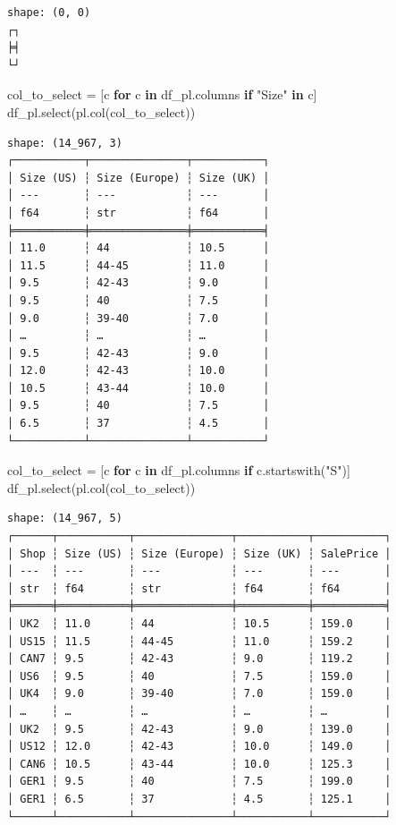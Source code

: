 \documentclass[
  letterpaper,
  DIV=11,
  numbers=noendperiod]{scrreprt}
\newenvironment{Shaded}{\begin{snugshade}}{\end{snugshade}}
\newcommand{\ControlFlowTok}[1]{\textcolor[rgb]{0.00,0.23,0.31}{\textbf{#1}}}
\newcommand{\KeywordTok}[1]{\textcolor[rgb]{0.00,0.23,0.31}{\textbf{#1}}}
\newcommand{\NormalTok}[1]{\textcolor[rgb]{0.00,0.23,0.31}{#1}}
\newcommand{\OperatorTok}[1]{\textcolor[rgb]{0.37,0.37,0.37}{#1}}
\newcommand{\StringTok}[1]{\textcolor[rgb]{0.13,0.47,0.30}{#1}}
\begin{document}
\begin{verbatim}
shape: (0, 0)
┌┐
╞╡
└┘
\end{verbatim}

\begin{Shaded}
\begin{Highlighting}[]
\NormalTok{col\_to\_select }\OperatorTok{=}\NormalTok{ [c }\ControlFlowTok{for}\NormalTok{ c }\KeywordTok{in}\NormalTok{ df\_pl.columns }\ControlFlowTok{if} \StringTok{"Size"} \KeywordTok{in}\NormalTok{ c]}
\NormalTok{df\_pl.select(pl.col(col\_to\_select))}
\end{Highlighting}
\end{Shaded}

\begin{verbatim}
shape: (14_967, 3)
┌───────────┬───────────────┬───────────┐
│ Size (US) ┆ Size (Europe) ┆ Size (UK) │
│ ---       ┆ ---           ┆ ---       │
│ f64       ┆ str           ┆ f64       │
╞═══════════╪═══════════════╪═══════════╡
│ 11.0      ┆ 44            ┆ 10.5      │
│ 11.5      ┆ 44-45         ┆ 11.0      │
│ 9.5       ┆ 42-43         ┆ 9.0       │
│ 9.5       ┆ 40            ┆ 7.5       │
│ 9.0       ┆ 39-40         ┆ 7.0       │
│ …         ┆ …             ┆ …         │
│ 9.5       ┆ 42-43         ┆ 9.0       │
│ 12.0      ┆ 42-43         ┆ 10.0      │
│ 10.5      ┆ 43-44         ┆ 10.0      │
│ 9.5       ┆ 40            ┆ 7.5       │
│ 6.5       ┆ 37            ┆ 4.5       │
└───────────┴───────────────┴───────────┘
\end{verbatim}

\begin{Shaded}
\begin{Highlighting}[]
\NormalTok{col\_to\_select }\OperatorTok{=}\NormalTok{ [c }\ControlFlowTok{for}\NormalTok{ c }\KeywordTok{in}\NormalTok{ df\_pl.columns }\ControlFlowTok{if}\NormalTok{ c.startswith(}\StringTok{"S"}\NormalTok{)]}
\NormalTok{df\_pl.select(pl.col(col\_to\_select))}
\end{Highlighting}
\end{Shaded}

\begin{verbatim}
shape: (14_967, 5)
┌──────┬───────────┬───────────────┬───────────┬───────────┐
│ Shop ┆ Size (US) ┆ Size (Europe) ┆ Size (UK) ┆ SalePrice │
│ ---  ┆ ---       ┆ ---           ┆ ---       ┆ ---       │
│ str  ┆ f64       ┆ str           ┆ f64       ┆ f64       │
╞══════╪═══════════╪═══════════════╪═══════════╪═══════════╡
│ UK2  ┆ 11.0      ┆ 44            ┆ 10.5      ┆ 159.0     │
│ US15 ┆ 11.5      ┆ 44-45         ┆ 11.0      ┆ 159.2     │
│ CAN7 ┆ 9.5       ┆ 42-43         ┆ 9.0       ┆ 119.2     │
│ US6  ┆ 9.5       ┆ 40            ┆ 7.5       ┆ 159.0     │
│ UK4  ┆ 9.0       ┆ 39-40         ┆ 7.0       ┆ 159.0     │
│ …    ┆ …         ┆ …             ┆ …         ┆ …         │
│ UK2  ┆ 9.5       ┆ 42-43         ┆ 9.0       ┆ 139.0     │
│ US12 ┆ 12.0      ┆ 42-43         ┆ 10.0      ┆ 149.0     │
│ CAN6 ┆ 10.5      ┆ 43-44         ┆ 10.0      ┆ 125.3     │
│ GER1 ┆ 9.5       ┆ 40            ┆ 7.5       ┆ 199.0     │
│ GER1 ┆ 6.5       ┆ 37            ┆ 4.5       ┆ 125.1     │
└──────┴───────────┴───────────────┴───────────┴───────────┘
\end{verbatim}
\end{document}
